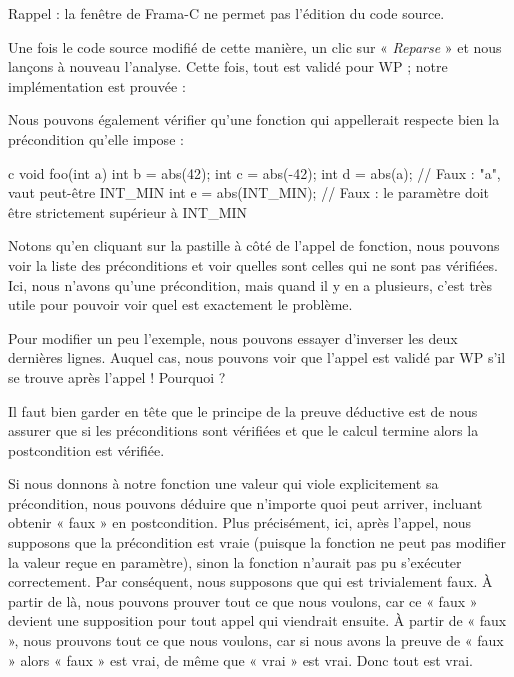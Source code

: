 \begin{Warning}
Rappel : la fenêtre de Frama-C ne permet pas l'édition du code source.
\end{Warning}


Une fois le code source modifié de cette manière, un clic sur « \textit{Reparse} » et 
nous lançons à nouveau l'analyse. Cette fois, tout est validé pour WP ; notre 
implémentation est prouvée :





Nous pouvons également vérifier qu'une fonction qui appellerait  
respecte bien la précondition qu'elle impose :



\begin{CodeBlock}{c}
void foo(int a){
   int b = abs(42);
   int c = abs(-42);
   int d = abs(a);       // Faux : "a", vaut peut-être INT_MIN
   int e = abs(INT_MIN); // Faux : le paramètre doit être strictement supérieur à INT_MIN
}
\end{CodeBlock}




Notons qu'en cliquant sur la pastille à côté de l'appel de fonction, nous
pouvons voir la liste des préconditions et voir quelles sont celles qui ne sont
pas vérifiées. Ici, nous n'avons qu'une précondition, mais quand il y en a
plusieurs, c'est très utile pour pouvoir voir quel est exactement le problème.




Pour modifier un peu l'exemple, nous pouvons essayer d'inverser les deux 
dernières lignes. Auquel cas, nous pouvons voir que l'appel 
est validé par WP s'il se trouve après l'appel  ! 
Pourquoi ?



Il faut bien garder en tête que le principe de la preuve déductive est de nous
assurer que si les préconditions sont vérifiées et que le calcul termine alors
la postcondition est vérifiée.


Si nous donnons à notre fonction une valeur qui viole explicitement sa
précondition, nous pouvons déduire que n'importe quoi peut arriver, incluant
obtenir « faux » en postcondition. Plus précisément, ici, après l'appel, nous
supposons que la précondition est vraie (puisque la fonction ne peut pas
modifier la valeur reçue en paramètre), sinon la fonction n'aurait pas pu
s'exécuter correctement. Par conséquent, nous supposons que
 qui est trivialement faux. À partir de là,
nous pouvons  prouver tout ce que nous voulons, car ce « faux » devient une
supposition pour tout appel qui viendrait ensuite. À partir de « faux », nous
prouvons tout ce que 
nous voulons, car si nous avons la preuve de « faux » alors « faux » est vrai,
de même que « vrai » est vrai. Donc tout est vrai.



